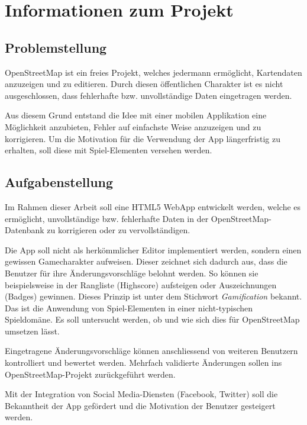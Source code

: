 \chapter{Informationen zum Projekt}
\label{informationen-projekt}


\section{Problemstellung}
\gls{OpenStreetMap} ist ein freies Projekt, welches jedermann ermöglicht, Kartendaten anzuzeigen und zu editieren.
Durch diesen öffentlichen Charakter ist es nicht ausgeschlossen, dass fehlerhafte bzw. unvollständige Daten eingetragen werden.

Aus diesem Grund entstand die Idee mit einer mobilen Applikation eine Möglichkeit anzubieten, Fehler auf einfachste Weise anzuzeigen und zu korrigieren.
Um die Motivation für die Verwendung der App längerfristig zu erhalten, soll diese mit Spiel-Elementen versehen werden.

\section{Aufgabenstellung}
Im Rahmen dieser Arbeit soll eine HTML5 \gls{WebApp} entwickelt werden, welche es ermöglicht, unvollständige bzw. fehlerhafte Daten in der \gls{OpenStreetMap}-Datenbank zu korrigieren oder zu vervollständigen.

Die App soll nicht als herkömmlicher Editor implementiert werden, sondern einen gewissen Gamecharakter aufweisen.
Dieser zeichnet sich dadurch aus, dass die Benutzer für ihre Änderungsvorschläge belohnt werden.
So können sie beispielsweise in der Rangliste (Highscore) aufsteigen oder Auszeichnungen (Badges) gewinnen.
Dieses Prinzip ist unter dem Stichwort \emph{Gamification} bekannt.
Das ist die Anwendung von Spiel-Elementen in einer nicht-typischen Spieldomäne.
Es soll untersucht werden, ob und wie sich dies für \gls{OpenStreetMap} umsetzen lässt.

Eingetragene Änderungsvorschläge können anschliessend von weiteren Benutzern kontrolliert und bewertet werden.
Mehrfach validierte Änderungen sollen ins \gls{OpenStreetMap}-Projekt zurückgeführt werden.

Mit der Integration von Social Media-Diensten (Facebook, Twitter) soll die Bekanntheit der App gefördert und die Motivation der Benutzer gesteigert werden.

